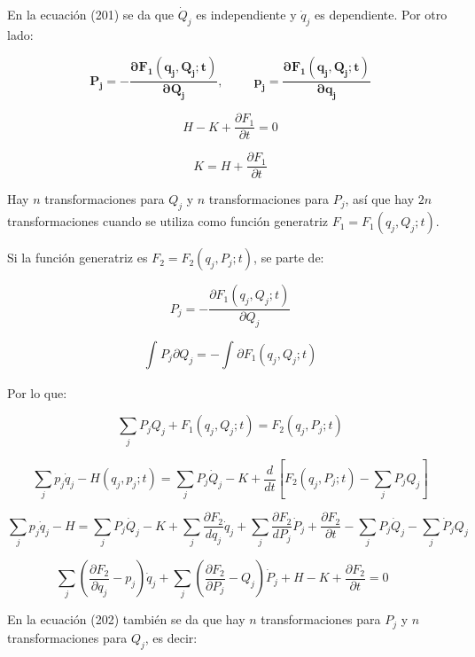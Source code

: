 \documentclass[]{article}
\begin{document}
En la ecuación (201) se da que \({\dot{Q}}_{j}\) es independiente y
\({\dot{q}}_{j}\) es dependiente. Por otro lado:

\[\mathbf{P}_{\mathbf{j}}\mathbf{= -}\frac{\mathbf{\partial}\mathbf{F}_{\mathbf{1}}\left( \mathbf{q}_{\mathbf{j}}\mathbf{,}\mathbf{Q}_{\mathbf{j}}\mathbf{;t} \right)}{\mathbf{\partial}\mathbf{Q}_{\mathbf{j}}}\mathbf{,\ \ \ \ \ \ \ \ \ \ \ }\mathbf{p}_{\mathbf{j}}\mathbf{=}\frac{\mathbf{\partial}\mathbf{F}_{\mathbf{1}}\left( \mathbf{q}_{\mathbf{j}}\mathbf{,}\mathbf{Q}_{\mathbf{j}}\mathbf{;t} \right)}{\mathbf{\partial}\mathbf{q}_{\mathbf{j}}}\]

\[H - K + \frac{\partial F_{1}}{\partial t} = 0\]

\[K = H + \frac{\partial F_{1}}{\partial t}\]

Hay \(n\) transformaciones para \(Q_{j}\) y \(n\) transformaciones para
\(P_{j}\), así que hay \(2n\) transformaciones cuando se utiliza como
función generatriz \(F_{1} = F_{1}\left( q_{j},Q_{j};t \right)\).

Si la función generatriz es
\(F_{2} = F_{2}\left( q_{j},P_{j};t \right)\), se parte de:

\[P_{j} = - \frac{\partial F_{1}\left( q_{j},Q_{j};t \right)}{\partial Q_{j}}\]

\[\int_{}^{}{P_{j}\partial Q_{j} = - \int_{}^{}{\partial F_{1}\left( q_{j},Q_{j};t \right)}}\]

Por lo que:

\[\sum_{j}^{}{P_{j}Q_{j} + F_{1}}\left( q_{j},Q_{j};t \right) = F_{2}\left( q_{j},P_{j};t \right)\]

\[\sum_{j}^{}{p_{j}{\dot{q}}_{j} - H\left( q_{j},p_{j};t \right)} = \sum_{j}^{}{P_{j}{\dot{Q}}_{j} - K} + \frac{d}{dt}\left\lbrack F_{2}\left( q_{j},P_{j};t \right) - \sum_{j}^{}{P_{j}Q_{j}} \right\rbrack\]

\[\sum_{j}^{}{p_{j}{\dot{q}}_{j} - H} = \sum_{j}^{}{P_{j}{\dot{Q}}_{j} - K} + \sum_{j}^{}{\frac{\partial F_{2}}{dq_{j}}{\dot{q}}_{j}} + \sum_{j}^{}{\frac{\partial F_{2}}{dP_{j}}{\dot{P}}_{j}} + \frac{\partial F_{2}}{\partial t} - \sum_{j}^{}{P_{j}{\dot{Q}}_{j}} - \sum_{j}^{}{{\dot{P}}_{j}Q_{j}}\]

\[\sum_{j}^{}\left( \frac{\partial F_{2}}{\partial q_{j}} - p_{j} \right){\dot{q}}_{j} + \sum_{j}^{}\left( \frac{\partial F_{2}}{\partial P_{j}} - Q_{j} \right){\dot{P}}_{j} + H - K + \frac{\partial F_{2}}{\partial t} = 0\ \ \ \ \ \ \]

En la ecuación (202) también se da que hay \(n\) transformaciones para
\(P_{j}\) y \(n\) transformaciones para \(Q_{j}\), es decir:
\end{document}
